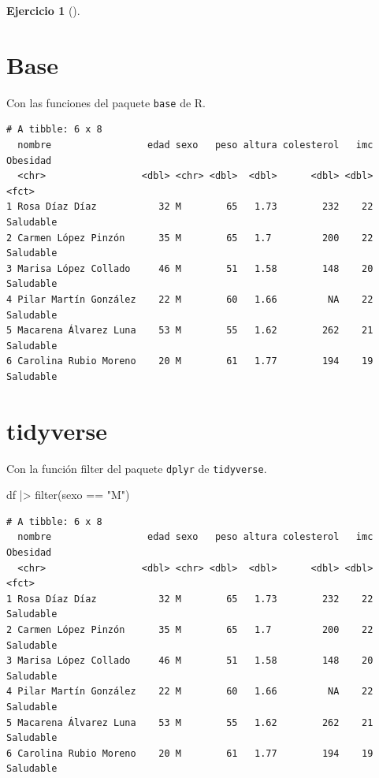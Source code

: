 \documentclass[
  a4paper,
]{scrreport}
\newenvironment{Shaded}{\begin{snugshade}}{\end{snugshade}}
\newcommand{\FunctionTok}[1]{\textcolor[rgb]{0.28,0.35,0.67}{#1}}
\newcommand{\NormalTok}[1]{\textcolor[rgb]{0.00,0.23,0.31}{#1}}
\newcommand{\SpecialCharTok}[1]{\textcolor[rgb]{0.37,0.37,0.37}{#1}}
\newcommand{\StringTok}[1]{\textcolor[rgb]{0.13,0.47,0.30}{#1}}
\theoremstyle{definition}
\newtheorem{exercise}{Ejercicio}[chapter]
\theoremstyle{remark}
\begin{document}
\begin{exercise}[]
\begin{enumerate}
\begin{tcolorbox}
  \section{Base}

  Con las funciones del paquete \texttt{base} de R.

\begin{Shaded}
\end{Shaded}

\begin{verbatim}
# A tibble: 6 x 8
  nombre                 edad sexo   peso altura colesterol   imc Obesidad 
  <chr>                 <dbl> <chr> <dbl>  <dbl>      <dbl> <dbl> <fct>    
1 Rosa Díaz Díaz           32 M        65   1.73        232    22 Saludable
2 Carmen López Pinzón      35 M        65   1.7         200    22 Saludable
3 Marisa López Collado     46 M        51   1.58        148    20 Saludable
4 Pilar Martín González    22 M        60   1.66         NA    22 Saludable
5 Macarena Álvarez Luna    53 M        55   1.62        262    21 Saludable
6 Carolina Rubio Moreno    20 M        61   1.77        194    19 Saludable
\end{verbatim}

  \section{tidyverse}

  Con la función filter del paquete \texttt{dplyr} de
  \texttt{tidyverse}.

\begin{Shaded}
\begin{Highlighting}[]
\NormalTok{df }\SpecialCharTok{|\textgreater{}} \FunctionTok{filter}\NormalTok{(sexo }\SpecialCharTok{==} \StringTok{"M"}\NormalTok{)}
\end{Highlighting}
\end{Shaded}

\begin{verbatim}
# A tibble: 6 x 8
  nombre                 edad sexo   peso altura colesterol   imc Obesidad 
  <chr>                 <dbl> <chr> <dbl>  <dbl>      <dbl> <dbl> <fct>    
1 Rosa Díaz Díaz           32 M        65   1.73        232    22 Saludable
2 Carmen López Pinzón      35 M        65   1.7         200    22 Saludable
3 Marisa López Collado     46 M        51   1.58        148    20 Saludable
4 Pilar Martín González    22 M        60   1.66         NA    22 Saludable
5 Macarena Álvarez Luna    53 M        55   1.62        262    21 Saludable
6 Carolina Rubio Moreno    20 M        61   1.77        194    19 Saludable
\end{verbatim}


\end{tcolorbox}
\end{enumerate}
\end{exercise}
\end{document}
